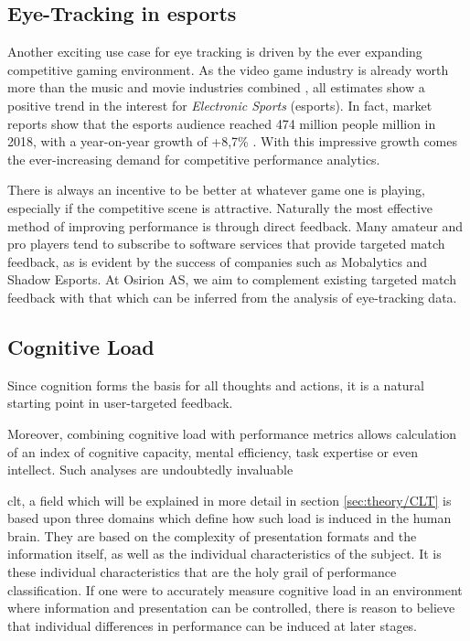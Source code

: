 \subsection{Eye-Tracking in esports}

Another exciting use case for eye tracking is driven by the ever expanding competitive gaming environment. As the video game industry is already worth more than the music and movie industries combined \cite{mangeloja2019}, all estimates show a positive trend in the interest for \textit{Electronic Sports} (esports). In fact, market reports show that the esports audience reached 474 million people million in 2018, with a year-on-year growth of +8,7\% \cite{newzoo2021}. With this impressive growth comes the ever-increasing demand for competitive performance analytics. 

There is always an incentive to be better at whatever game one is playing, especially if the competitive scene is attractive. Naturally the most effective method of improving performance is through direct feedback. Many amateur and pro players tend to subscribe to software services that provide targeted match feedback, as is evident by the success of companies such as Mobalytics and Shadow Esports. At Osirion AS, we aim to complement existing targeted match feedback with that which can be inferred from the analysis of eye-tracking data.

\subsection{Cognitive Load}

Since cognition forms the basis for all thoughts and actions, it is a natural starting point in user-targeted feedback. 

Moreover, combining cognitive load with performance metrics allows calculation of an index of cognitive capacity, mental efficiency, task expertise or even intellect. Such analyses are undoubtedly invaluable 

\acrfull{clt}, a field which will be explained in more detail in section \ref{sec:theory/CLT} is based upon three domains which define how such load is induced in the human brain. They are based on the complexity of presentation formats and the information itself, as well as the individual characteristics of the subject. It is these individual characteristics that are the holy grail of performance classification. If one were to accurately measure cognitive load in an environment where information and presentation can be controlled, there is reason to believe that individual differences in performance can be induced at later stages.

